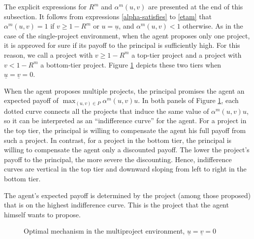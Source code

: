\documentclass[12pt,english]{article}
\newcommand{\underv}{\underline{v}}
\newcommand{\under}{\underline}
\newcommand{\underu}{{\underline{u}}}
\theoremstyle{remark}
\theoremstyle{plain}
\theoremstyle{definition}
\begin{document}






The explicit expressions for $R^m$ and $\alpha^m(u,v)$ are presented at the end of this subsection. It follows from expressions \eqref{alpha-satisfies} to \eqref{etam} that $\alpha^m(u,v)=1$ if $v \geqslant 1-R^m$ or $u=\under u$, and $\alpha^m(u,v)<1$ otherwise. As in the case of the single-project environment, when the agent proposes only one project, it is approved for sure if its payoff to the principal is sufficiently high. For this reason, we call a project with $v \geqslant 1-R^m$ a top-tier project and a project with $v < 1-R^m$ a bottom-tier project. Figure \ref{fg:compromise} depicts these two tiers when $\underu=\underv=0$.



When the agent proposes multiple projects, the principal promises the agent an expected payoff of $\max_{(u,v)\in P} \alpha^m(u,v)u$. In both panels of Figure \ref{fg:compromise}, each dotted curve connects all the projects that induce the same value of $\alpha^m(u,v)u$, so it can be interpreted as an ``indifference curve'' for the agent. For a project in the top tier, the principal is willing to compensate the agent his full payoff from such a project. In contrast, for a project in the bottom tier, the principal is willing to compensate the agent only a discounted payoff. The lower the project's payoff to the principal, the more severe the discounting. Hence, indifference curves are vertical in the top tier and downward sloping from left to right in the bottom tier.   


The agent's expected payoff is determined by the project (among those proposed) that is on the highest indifference curve. This is the project that the agent himself wants to propose.

\begin{figure}[htb!]
\begin{center}

\end{center}
\vspace{-6 mm}
\caption{Optimal mechanism in the multiproject environment, $\underu=\underv=0$}
\label{fg:compromise}
\end{figure}
\end{document}
